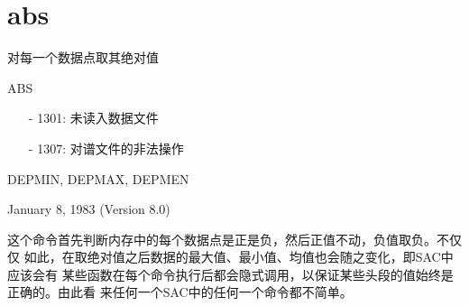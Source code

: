 \section{abs}
\label{cmd:abs}

对每一个数据点取其绝对值

ABS

\begin{itemize}
\item[-]1301: 未读入数据文件
\item[-]1307: 对谱文件的非法操作
\end{itemize}

DEPMIN, DEPMAX, DEPMEN

January 8, 1983 (Version 8.0)

这个命令首先判断内存中的每个数据点是正是负，然后正值不动，负值取负。不仅仅
如此，在取绝对值之后数据的最大值、最小值、均值也会随之变化，即SAC中应该会有
某些函数在每个命令执行后都会隐式调用，以保证某些头段的值始终是正确的。由此看
来任何一个SAC中的任何一个命令都不简单。
